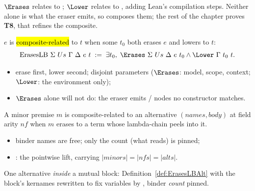 $\Erases$ relates  to \lbox{}; $\Lower$ relates \lbox{} to \lbox{}, adding Lean's
compilation steps. Neither alone is what the eraser emits, so  composes them; the rest of
the chapter proves \textbf{T8}, that  refines the composite.

\begin{definition}
\label{def:ErasesLB}
\leanok
{}
 $e$ is \hl{composite-related} to $t$ when some $t_0$ both erases $e$ and lowers to $t$:
\[ \mathrm{ErasesLB}\ \Sigma\ Us\ \Gamma\ \Delta\ e\ t \;:=\; \exists t_0,\; \Erases\ \Sigma\ Us\ \Delta\ e\ t_0 \wedge \Lower\ \Gamma\ t_0\ t . \]
\begin{itemize}
\item erase first, lower second; disjoint parameters ($\Erases$: model, scope, context; $\Lower$: the
\lbox{} environment only);
\item $\Erases$ alone will not do: the eraser emits / nodes no 
constructor matches.
\end{itemize}
\end{definition}

\begin{definition}
\label{def:ErasesLBAlt}
\leanok
{}
 A minor premise $m$ is composite-related to an alternative $(\mathit{names},
\mathit{body})$ at field arity $\mathit{nf}$ when $m$ erases to a term whose lambda-chain 
peels into it.
\begin{itemize}
\item binder names are free; only the count (what  reads) is pinned;
\item {}: the pointwise lift, carrying $|\mathit{minors}| = |\mathit{nfs}| =
|\mathit{alts}|$.
\end{itemize}
\end{definition}

\begin{definition}
\label{def:ErasesLBFixAlt}
\leanok
{}
 One alternative \emph{inside} a mutual block: Definition~\ref{def:ErasesLBAlt} with the
block's kernames rewritten to fix variables by , binder \emph{count} pinned.
\end{definition}

